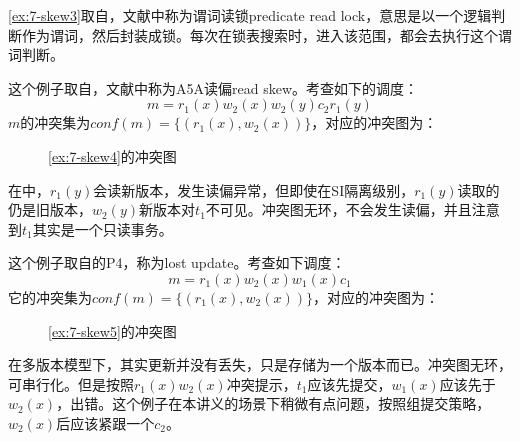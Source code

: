 \examplename\ref{ex:7-skew3}取自\cite{fekete2005making}，文献中称为谓词读锁predicate read lock，意思是以一个逻辑判断作为谓词，然后封装成锁。每次在锁表搜索时，进入该范围，都会去执行这个谓词判断。

\begin{example}\label{ex:7-skew4}
    这个例子取自\cite{berenson1995critique}，文献中称为A5A读偏read skew。考查如下的调度：
$$
m = r_1(x)w_2(x)w_2(y)c_2r_1(y)
$$
$m$的冲突集为$conf(m) = \{(r_1(x),w_2(x))\}$，对应的冲突图为：

\begin{figure}[H]
    \centering
    \caption{\examplename\ref{ex:7-skew4}的冲突图}
\end{figure}

在\cite{berenson1995critique}中，$r_1(y)$会读新版本，发生读偏异常，但即使在SI隔离级别，$r_1(y)$读取的仍是旧版本，$w_2(y)$新版本对$t_1$不可见。冲突图无环，不会发生读偏，并且注意到$t_1$其实是一个只读事务。

\end{example}

\begin{example}\label{ex:7-skew5}
    这个例子取自\cite{berenson1995critique}的P4，称为lost update。考查如下调度：
$$
m=r_1(x)w_2(x)w_1(x)c_1
$$
它的冲突集为$conf(m) = \{(r_1(x),w_2(x))\}$，对应的冲突图为：

\begin{figure}[H]
    \centering
    \caption{\examplename\ref{ex:7-skew5}的冲突图}
\end{figure}

在多版本模型下，其实更新并没有丢失，只是存储为一个版本而已。冲突图无环，可串行化。但是按照$r_1(x)w_2(x)$冲突提示，$t_1$应该先提交，$w_1(x)$应该先于$w_2(x)$，出错。这个例子在本讲义的场景下稍微有点问题，按照组提交策略，$w_2(x)$后应该紧跟一个$c_2$。

\end{example}

